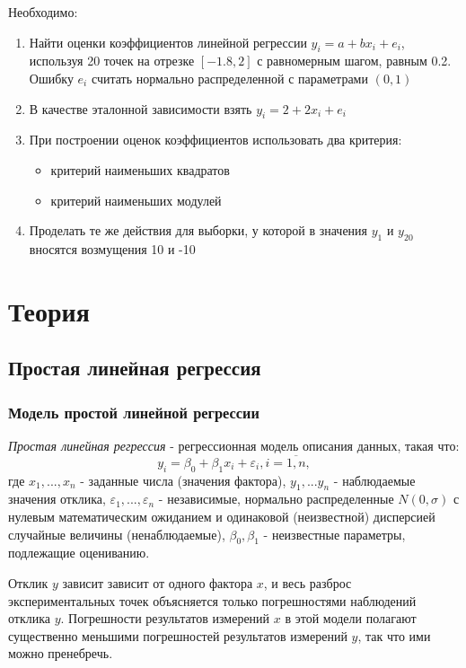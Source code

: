\documentclass[12pt,a4paper]{article}
\begin{document}
Необходимо:
\begin{enumerate}
    \item Найти оценки коэффициентов линейной регрессии $y_i=a+bx_i+e_i$, используя 20 точек на отрезке $[-1.8,2]$ с равномерным шагом, равным 0.2. Ошибку $e_i$ считать нормально распределенной с параметрами $(0,1)$
    \item В качестве эталонной зависимости взять $y_i=2+2x_i+e_i$
    \item При построении оценок коэффициентов использовать два критерия:
        \begin{itemize}
            \item критерий наименьших квадратов
            \item критерий наименьших модулей
        \end{itemize}
    \item Проделать те же действия для выборки, у которой в значения $y_1$ и $y_{20}$ вносятся возмущения 10 и -10
\end{enumerate}

\section{Теория}
\subsection{Простая линейная регрессия}
\subsubsection{Модель простой линейной регрессии}
\textit{Простая линейная регрессия} - регрессионная модель описания данных, такая что:
\begin{equation}
    y_i=\beta_0+\beta_1x_i+\varepsilon_i,i=\overline{1,n},
\end{equation}
где $x_1,...,x_n$ - заданные числа (значения фактора), $y_1,...y_n$ - наблюдаемые значения отклика, $\varepsilon_1,...,\varepsilon_n$ -  независимые, нормально распределенные $N(0,\sigma)$ с нулевым математическим ожиданием и одинаковой (неизвестной) дисперсией случайные величины (ненаблюдаемые),	$\beta_0,\beta_1$ - неизвестные параметры, подлежащие оцениванию.

Отклик $y$ зависит зависит от одного фактора $x$, и весь разброс экспериментальных точек объясняется только погрешностями наблюдений отклика $y$. Погрешности результатов измерений $x$ в этой модели полагают существенно меньшими погрешностей результатов измерений $y$, так что ими можно пренебречь.
\end{document}
